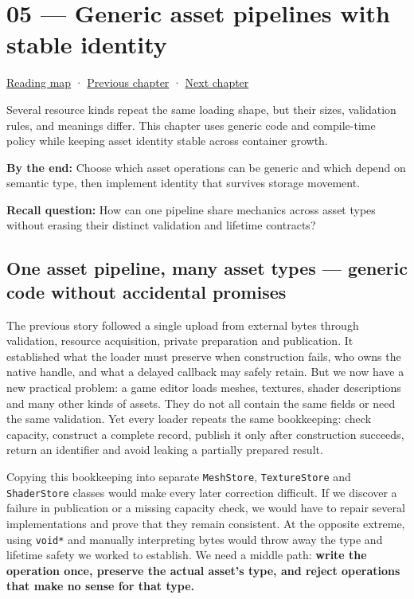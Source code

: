 \hypertarget{05-engine-i-ch005}{}
\section{05 --- Generic asset pipelines with stable identity}\label{generic-asset-pipelines-with-stable-identity}

\href{Chapter\%20Edition/03\%20-\%20Game\%20Engine/00\%20-\%20Reading\%20Map}{Reading map} · \hyperref[05-engine-i-ch004]{Previous chapter} · \hyperref[05-engine-i-ch006]{Next chapter}

Several resource kinds repeat the same loading shape, but their sizes, validation rules, and meanings differ. This chapter uses generic code and compile-time policy while keeping asset identity stable across container growth.

\textbf{By the end:} Choose which asset operations can be generic and which depend on semantic type, then implement identity that survives storage movement.

\textbf{Recall question:} How can one pipeline share mechanics across asset types without erasing their distinct validation and lifetime contracts?

\subsection{One asset pipeline, many asset types --- generic code without accidental promises}\label{one-asset-pipeline-many-asset-types-generic-code-without-accidental-promises}

The previous story followed a single upload from external bytes through validation, resource acquisition, private preparation and publication. It established what the loader must preserve when construction fails, who owns the native handle, and what a delayed callback may safely retain. But we now have a new practical problem: a game editor loads meshes, textures, shader descriptions and many other kinds of assets. They do not all contain the same fields or need the same validation. Yet every loader repeats the same bookkeeping: check capacity, construct a complete record, publish it only after construction succeeds, return an identifier and avoid leaking a partially prepared result.

Copying this bookkeeping into separate \texttt{MeshStore}, \texttt{TextureStore} and \texttt{ShaderStore} classes would make every later correction difficult. If we discover a failure in publication or a missing capacity check, we would have to repair several implementations and prove that they remain consistent. At the opposite extreme, using \texttt{void*} and manually interpreting bytes would throw away the type and lifetime safety we worked to establish. We need a middle path: \textbf{write the operation once, preserve the actual asset's type, and reject operations that make no sense for that type.}

